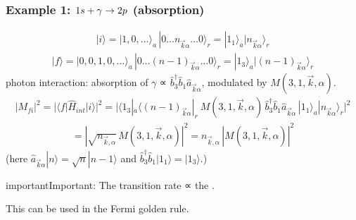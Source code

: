 \documentclass[letterpaper,10pt,english]{jupyterBook}
\begin{document}
\subsubsection*{Example 1: \protect\(1s+\gamma\to2p\protect\) (absorption)}
\begin{equation*}
\begin{split}
|i\rangle=|1,0,\dots\rangle_a\,|0\dots n_{\vec k\alpha}\dots0\rangle_r=|1_1\rangle_a|n_{\vec k\alpha}\rangle_r
\end{split}
\end{equation*}\begin{equation*}
\begin{split}
|f\rangle=|0,0,1,0,\dots\rangle_a\,|0\dots(n-1)_{\vec k\alpha}\dots0\rangle_r=|1_3\rangle_a|(n-1)_{\vec k\alpha}\rangle_r
\end{split}
\end{equation*}
\sphinxhyphen{}photon interaction: absorption of \(\gamma\) ∝ \(\hat b_3^\dagger\hat b_1\hat a_{\vec k\alpha}\), modulated by \(M(3,1,\vec k,\alpha)\).
\begin{equation*}
\begin{split}
|M_{fi}|^2=|\langle f|\hat H_{int}|i\rangle|^2
=\Big|\langle1_3|_a\langle(n-1)_{\vec k\alpha}|_r\ M(3,1,\vec k,\alpha)\,\hat b_3^\dagger\hat b_1\hat a_{\vec k\alpha}\,|1_1\rangle_a|n_{\vec k\alpha}\rangle_r\Big|^2
\end{split}
\end{equation*}\begin{equation*}
\begin{split}
=\left|\sqrt{n_{\vec k,\alpha}}\,M(3,1,\vec k,\alpha)\right|^2=n_{\vec k,\alpha}\,|M(3,1,\vec k,\alpha)|^2
\end{split}
\end{equation*}
\sphinxAtStartPar
(here \(\hat a_{\vec k\alpha}|n\rangle=\sqrt n|n-1\rangle\) and \(\hat b_3^\dagger\hat b_1|1_1\rangle=|1_3\rangle\).)

\begin{sphinxadmonition}{important}{Important:}
\sphinxAtStartPar
The transition rate ∝ the .
\end{sphinxadmonition}

\sphinxAtStartPar
This can be used in the Fermi golden rule.
\end{document}
